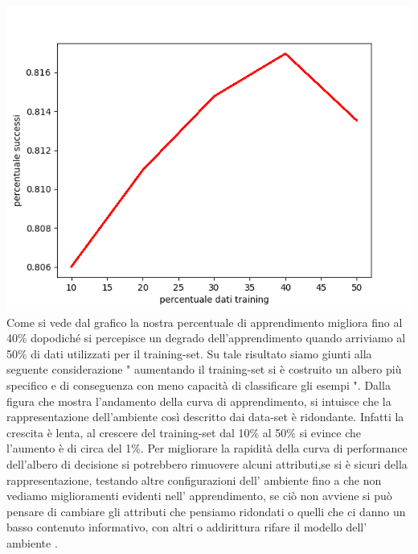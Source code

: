 		\includegraphics[scale=0.86]{performance.png}
		Come si vede dal grafico la nostra percentuale di apprendimento migliora fino al 40\% dopodiché si percepisce un degrado dell'apprendimento quando arriviamo al 50\% di dati utilizzati per il training-set.
		\newline
		 Su tale risultato siamo giunti alla seguente considerazione " aumentando il training-set si è costruito un albero più specifico e di conseguenza  con meno capacità di classificare gli esempi ".
		 Dalla figura che mostra l'andamento della curva di apprendimento, si intuisce che la rappresentazione dell'ambiente così descritto dai data-set è ridondante.
		  Infatti la crescita è lenta, al crescere del training-set dal 10\% al 50\% si evince che l'aumento è di circa del 1\%.
		  Per migliorare la rapidità della curva di performance dell'albero di decisione si potrebbero rimuovere alcuni attributi,se si è sicuri della rappresentazione, testando altre configurazioni dell' ambiente fino a che non vediamo miglioramenti evidenti nell' apprendimento, se ciò non avviene si può pensare di cambiare gli attributi che pensiamo ridondati o quelli che ci danno un basso contenuto informativo, con altri o addirittura rifare il modello dell' ambiente . 
		\subsection{}
		
